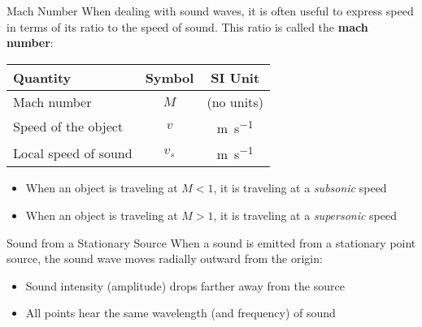 \documentclass[12pt,aspectratio=169]{beamer}
\newcommand{\eq}[2]{\vspace{#1}{\Large\begin{displaymath}#2\end{displaymath}}}
\begin{document}
\begin{frame}{Mach Number}
  When dealing with sound waves, it is often useful to express speed in terms
  of its ratio to the speed of sound. This ratio is called the
  \textbf{mach number}:
  
  \eq{-.2in}{
    \boxed{M=\frac{v}{v_s}}
  }
  \begin{center}
    \begin{tabular}{l|c|c}
      \rowcolor{pink}
      \textbf{Quantity} & \textbf{Symbol} & \textbf{SI Unit} \\ \hline
      Mach number          & $M$   & (no units) \\
      Speed of the object  & $v$   & \si{\metre\per\second}\\
      Local speed of sound & $v_s$ & \si{\metre\per\second}
    \end{tabular}
  \end{center}
  \begin{itemize}
  \item When an object is traveling at $M<1$, it is traveling at a
    \emph{subsonic} speed
  \item When an object is traveling at $M>1$, it is traveling at a
    \emph{supersonic} speed
  \end{itemize}
\end{frame}


\begin{frame}{Sound from a Stationary Source}
  When a sound is emitted from a stationary point source, the sound wave moves
  radially outward from the origin:
  \begin{center}
    \begin{itemize}
    \item Sound intensity (amplitude) drops farther away from the source
    \item All points hear the same wavelength (and frequency) of sound
    \end{itemize}
  \end{center}
\end{frame}
\end{document}
